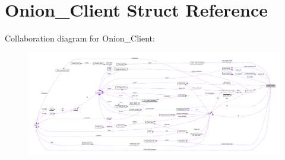 \hypertarget{struct_onion___client}{\section{Onion\+\_\+\+Client Struct Reference}
\label{struct_onion___client}
}


Collaboration diagram for Onion\+\_\+\+Client\+:
\nopagebreak
\begin{figure}[H]
\begin{center}
\leavevmode
\includegraphics[width=350pt]{struct_onion___client__coll__graph}
\end{center}
\end{figure}
